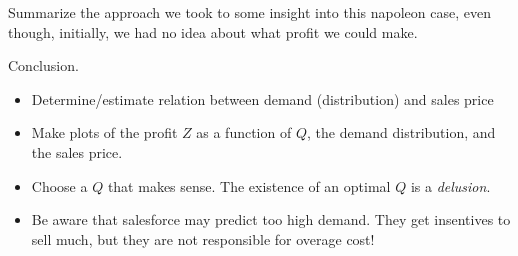 \begin{question}
   Summarize the approach we took to some insight into this napoleon
   case, even though, initially, we had no idea about what profit we
   could make.
   \begin{solution}
Conclusion.
  \begin{itemize}
  \item Determine/estimate relation between demand (distribution) and sales price
  \item Make plots of the profit $Z$ as a function of $Q$, the demand
    distribution, and the sales price.
  \item Choose a $Q$ that makes sense. The existence of an optimal $Q$
    is a \emph{delusion}.
  \item Be aware that salesforce may predict too high demand. They get insentives to sell much, but they are not responsible for overage cost!
  \end{itemize}
   \end{solution}
 \end{question}


